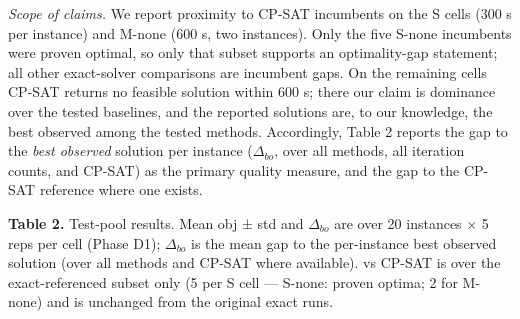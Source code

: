 \documentclass[
]{article}
\newcounter{none} %
\begin{document}
\emph{Scope of claims.} We report proximity to CP-SAT incumbents on the
S cells (300 s per instance) and M-none (600 s, two instances). Only the
five S-none incumbents were proven optimal, so only that subset supports
an optimality-gap statement; all other exact-solver comparisons are
incumbent gaps. On the remaining cells CP-SAT returns no feasible
solution within 600 s; there our claim is dominance over the tested
baselines, and the reported solutions are, to our knowledge, the best
observed among the tested methods. Accordingly, Table 2 reports the gap
to the \emph{best observed} solution per instance (\(\Delta_{bo}\), over
all methods, all iteration counts, and CP-SAT) as the primary quality measure,
and the gap to the CP-SAT reference where one exists.

\textbf{Table 2.} Test-pool results. Mean obj ± std and \(\Delta_{bo}\)
are over 20 instances × 5 reps per cell (Phase D1); \(\Delta_{bo}\) is
the mean gap to the per-instance best observed solution (over all methods
and CP-SAT where available). vs CP-SAT is over the exact-referenced
subset only (5 per S cell --- S-none: proven optima; 2 for M-none) and
is unchanged from the original exact runs.
\end{document}
